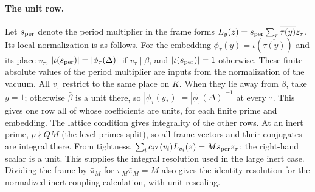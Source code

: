 \paragraph{The unit row.}
Let $s_{\rm per}$ denote the period multiplier in the frame forms
$L_y(z)=s_{\rm per}\sum_\tau\overline{\tau(y)}z_\tau$. Its local
normalization is as follows. For the embedding
$\phi_\tau(y)=\iota(\overline{\tau(y)})$ and its place $v_\tau$,
$|\iota(s_{\rm per})|=|\phi_\tau(\Delta)|$ if $v_\tau\mid\beta$, and
$|\iota(s_{\rm per})|=1$ otherwise. These finite absolute values of the
period multiplier are inputs from the normalization of the vacuum.
All $v_\tau$ restrict to the same place on $K$. When they lie away
from $\beta$, take $y=1$; otherwise $\bar\beta$ is a unit there,
so $|\phi_\tau(y_*)|=|\phi_\tau(\Delta)|^{-1}$ at every $\tau$.
This gives one row all of whose coefficients are units, for each
finite prime and embedding. The lattice condition gives integrality
of the other rows. At an inert prime, $p\nmid Q M$ (the level primes
split), so all frame vectors and their conjugates are integral there.
From tightness,
$\sum_i c_i\tau(v_i)L_{v_i}(z)=M s_{\rm per} z_\tau$; the right-hand
scalar is a unit. This supplies the integral resolution used in the
large inert case. Dividing the frame by $\bar\pi_M$ for
$\pi_M\bar\pi_M=M$ also gives the identity resolution for the
normalized inert coupling calculation, with unit rescaling.
